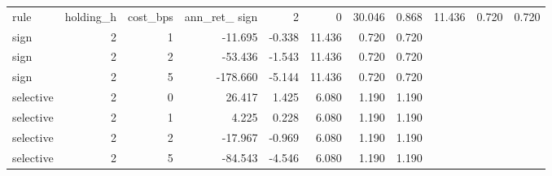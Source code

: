 \begin{tabular}{lrrrrrrr}
\toprule
rule & holding_h & cost_bps & ann_ret_%
\midrule
sign & 2 & 0 & 30.046 & 0.868 & 11.436 & 0.720 & 0.720 \\
sign & 2 & 1 & -11.695 & -0.338 & 11.436 & 0.720 & 0.720 \\
sign & 2 & 2 & -53.436 & -1.543 & 11.436 & 0.720 & 0.720 \\
sign & 2 & 5 & -178.660 & -5.144 & 11.436 & 0.720 & 0.720 \\
selective & 2 & 0 & 26.417 & 1.425 & 6.080 & 1.190 & 1.190 \\
selective & 2 & 1 & 4.225 & 0.228 & 6.080 & 1.190 & 1.190 \\
selective & 2 & 2 & -17.967 & -0.969 & 6.080 & 1.190 & 1.190 \\
selective & 2 & 5 & -84.543 & -4.546 & 6.080 & 1.190 & 1.190 \\
\bottomrule
\end{tabular}
